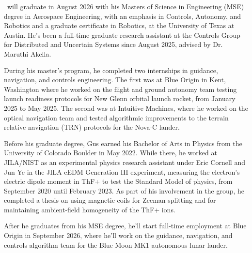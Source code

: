 
\begin{vita}

\theauthor\ will graduate in August 2026 with his Masters of Science in Engineering (MSE) degree in Aerospace Engineering, with an emphasis in Controls, Autonomy, and Robotics and a graduate certificate in Robotics, at the University of Texas at Austin. He's been a full-time graduate research assistant at the Controls Group for Distributed and Uncertain Systems since August 2025, advised by Dr. Maruthi Akella.

During his master's program, he completed two internships in guidance, navigation, and controls engineering. The first was at Blue Origin in Kent, Washington where he worked on the flight and ground autonomy team testing launch readiness protocols for New Glenn orbital launch rocket, from January 2025 to May 2025. The second was at Intuitive Machines, where he worked on the optical navigation team and tested algorithmic improvements to the terrain relative navigation (TRN) protocols for the Nova-C lander.

Before his graduate degree, Gus earned his Bachelor of Arts in Physics from the University of Colorado Boulder in May 2022. While there, he worked at JILA/NIST as an experimental physics research assistant under Eric Cornell and Jun Ye in the JILA eEDM Generation III experiment, measuring the electron's electric dipole moment in ThF+ to test the Standard Model of physics, from September 2020 until February 2023. As part of his involvement in the group, he completed a thesis on using magnetic coils for Zeeman splitting and for maintaining ambient-field homogeneity of the ThF+ ions.

After he graduates from his MSE degree, he'll start full-time employment at Blue Origin in September 2026, where he'll work on the guidance, navigation, and controls algorithm team for the Blue Moon MK1 autonomous lunar lander.




\end{vita}
